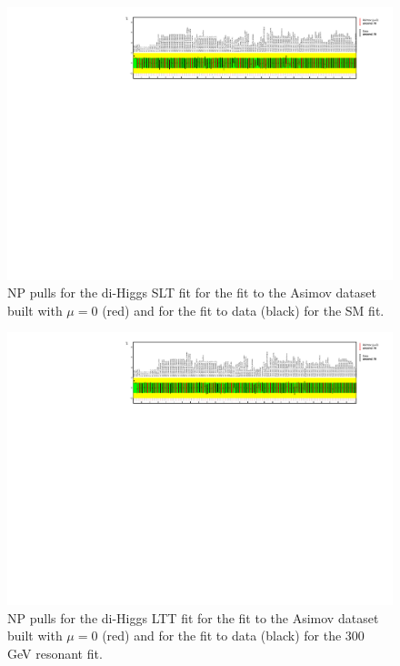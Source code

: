 \begin{figure}
\centering
\includegraphics[angle=270]{figures/results/HH/LepHad/NP_allExceptGammas_SM_SLT.pdf}
\caption{NP pulls for the di-Higgs \lephad SLT fit for the fit to the Asimov dataset built with $\mu=0$ (red) and for the fit to data (black) for the SM fit.}
\label{fig:LepHadPostfitNPPullsSMSLT}
\end{figure}

\begin{figure}
\centering
\includegraphics[angle=270]{figures/results/HH/LepHad/NP_allExceptGammas_2HDM300_LTT.pdf}
\caption{NP pulls for the di-Higgs \lephad LTT fit for the fit to the Asimov dataset built with $\mu=0$ (red) and for the fit to data (black) for the 300 GeV resonant fit.}
\label{fig:LepHadPostfitNPPulls2HDM300LTT}
\end{figure}

